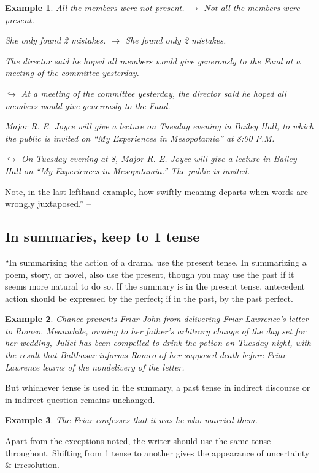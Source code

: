 \documentclass[oneside]{book}
\numberwithin{equation}{section}
\newtheorem{example}{Example}[chapter]
\begin{document}
\begin{example}
	All the members were not present. $\to$ Not all the members were present.
	
	She only found 2 mistakes. $\to$ She found only 2 mistakes.
	
	The director said he hoped all members would give generously to the Fund at a meeting of the committee yesterday.
	
	$\hookrightarrow$ At a meeting of the committee yesterday, the director said he hoped all members would give generously to the Fund.
	
	Major R. E. Joyce will give a lecture on Tuesday evening in Bailey Hall, to which the public is invited on ``My Experiences in Mesopotamia'' at 8:00 P.M.
	
	$\hookrightarrow$ On Tuesday evening at 8, Major R. E. Joyce will give a lecture in Bailey Hall on ``My Experiences in Mesopotamia.'' The public is invited.
\end{example}
Note, in the last lefthand example, how swiftly meaning departs when words are wrongly juxtaposed.'' -- \cite[Chap. 2, Sect. 20, pp. 43--45]{Strunk_White2019}

\subsection{In summaries, keep to 1 tense}
``In summarizing the action of a drama, use the present tense. In summarizing a poem, story, or novel, also use the present, though you may use the past if it seems more natural to do so. If the summary is in the present tense, antecedent action should be expressed by the perfect; if in the past, by the past perfect.

\begin{example}
	Chance prevents Friar John from delivering Friar Lawrence's letter to Romeo. Meanwhile, owning to her father's arbitrary change of the day set for her wedding, Juliet has been compelled to drink the potion on Tuesday night, with the result that Balthasar informs Romeo of her supposed death before Friar Lawrence learns of the nondelivery of the letter.
\end{example}
But whichever tense is used in the summary, a past tense in indirect discourse or in indirect question remains unchanged.

\begin{example}
	The Friar confesses that it was he who married them.
\end{example}
Apart from the exceptions noted, the writer should use the same tense throughout. Shifting from 1 tense to another gives the appearance of uncertainty \& irresolution.
\end{document}
